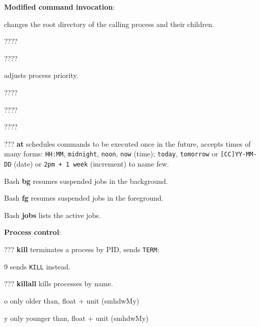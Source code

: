 \textbf{Modified command invocation}:
\begin{compactenum}
	\item [\symbolcoreutils]  changes the root directory of the calling process and their children.

	\item [\symbolcoreutils]  \dotfill ????

	\item [\symbolcoreutils]  \dotfill ????

	\item [\symbolcoreutils]  adjusts process priority.

	\item [\symbolcoreutils]  \dotfill ????

	\item [\symbolcoreutils]  \dotfill ????

	\item [\symbolcoreutils]  \dotfill ????
\end{compactenum}

\begin{compactenum}
	\item [???] \textbf{at} schedules commands to be executed once in the future, accepts times of many forms:
	\texttt{HH:MM}, \texttt{midnight}, \texttt{noon}, \texttt{now} (time);
	\texttt{today}, \texttt{tomorrow} or \texttt{[CC]YY-MM-DD} (date)
	or \texttt{2pm + 1 week} (increment) to name few.
\end{compactenum}

\begin{compactenum}
	\item [Bash] \textbf{bg} resumes suspended jobs in the background.
	\item [Bash] \textbf{fg} resumes suspended jobs in the foreground.
	\item [Bash] \textbf{jobs} lists the active jobs.
\end{compactenum}

\textbf{Process control}:
\begin{compactenum}
	\item [???] \textbf{kill} terminates a process by PID, sends \texttt{TERM}:
	\item [9] sends \texttt{KILL} instead.
	\item [???] \textbf{killall} kills processes by name.
	\item [o] only older than, float + unit (smhdwMy)
	\item [y] only younger than, float + unit (smhdwMy)
\end{compactenum}

